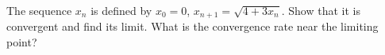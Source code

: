 The sequence $x_n$ is defined by $x_0 = 0$, $x_{n+1} = \sqrt{4 + 3x_n}$. Show that it is convergent and find its limit. What is the convergence rate near the limiting point?
